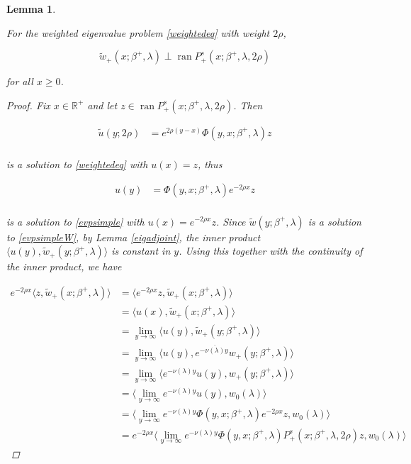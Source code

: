\documentclass[12pt]{article}
\def\R{{\mathbb R}}
\DeclareMathOperator{\ran}{ran}
\newtheorem{lemma}{Lemma}
\begin{document}
\begin{lemma}\label{wperpstable}

For the weighted eigenvalue problem \eqref{weightedeq} with weight $2 \rho$,

\begin{equation}
\tilde{w}_+(x; \beta^+, \lambda) \perp \ran P^s_+(x; \beta^+, \lambda, 2 \rho)
\end{equation}

for all $x \geq 0$.

\begin{proof}

Fix $x \in \R^+$ and let $z \in \ran P^s_+(x; \beta^+, \lambda, 2 \rho)$. Then

\begin{align*}
\tilde{u}(y; 2 \rho) &= e^{2 \rho(y - x)} \Phi(y, x; \beta^+, \lambda)z\\
\end{align*}

is a solution to \eqref{weightedeq} with $u(x) = z$, thus

\begin{align*}
u(y) &= \Phi(y, x; \beta^+, \lambda) e^{-2 \rho x} z\\
\end{align*}

is a solution to \eqref{evpsimple} with $u(x) = e^{-2 \rho x} z$. Since $\tilde{w}(y; \beta^+, \lambda)$ is a solution to \eqref{evpsimpleW}, by Lemma \ref{eigadjoint}, the inner product $\langle u(y), \tilde{w}_+(y; \beta^+, \lambda) \rangle$ is constant in $y$. Using this together with the continuity of the inner product, we have

\begin{align*}
e^{-2 \rho x} \langle z, \tilde{w}_+(x; \beta^+, \lambda) \rangle &= 
\langle e^{-2 \rho x} z, \tilde{w}_+(x; \beta^+, \lambda) \rangle \\
&= \langle u(x), \tilde{w}_+(x; \beta^+, \lambda) \rangle \\
&= \lim_{y \rightarrow \infty} \langle u(y), \tilde{w}_+(y; \beta^+, \lambda) \rangle \\
&= \lim_{y \rightarrow \infty} \langle u(y), e^{-\overline{\nu(\lambda)} y } w_+(y; \beta^+, \lambda) \rangle \\
&= \lim_{y \rightarrow \infty} \langle e^{-{\nu(\lambda)} y } u(y), w_+(y; \beta^+, \lambda) \rangle\\
&= \langle \lim_{y \rightarrow \infty} e^{-{\nu(\lambda)} y } u(y), w_0(\lambda) \rangle \\
&= \langle \lim_{y \rightarrow \infty} e^{-{\nu(\lambda)} y } \Phi(y, x; \beta^+, \lambda) e^{-2 \rho x} z, w_0(\lambda) \rangle \\
&= e^{-2 \rho x} \langle \lim_{y \rightarrow \infty} e^{-{\nu(\lambda)} y } \Phi(y, x; \beta^+, \lambda) P^s_+(x; \beta^+, \lambda, 2 \rho) z, w_0(\lambda) \rangle 
\end{align*}


\end{proof}
\end{lemma}
\end{document}
